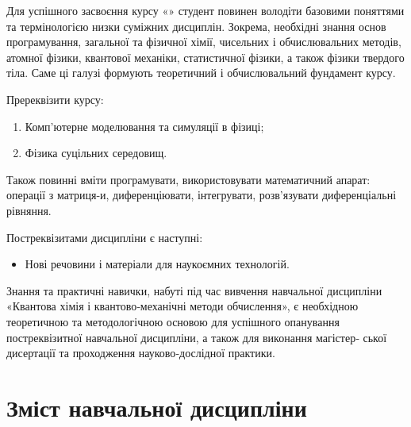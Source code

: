 \documentclass{Syllabus}
\begin{document}

Для успішного засвоєння курсу «\discipline» студент повинен володіти базовими поняттями та термінологією низки суміжних дисциплін. Зокрема, необхідні знання основ програмування, загальної та фізичної хімії, чисельних і обчислювальних методів, атомної фізики, квантової механіки, статистичної фізики, а також фізики твердого тіла. Саме ці галузі формують теоретичний і обчислювальний фундамент курсу.

Пререквізити курсу:

\begin{enumerate}
\item Комп’ютерне моделювання та симуляції в фізиці;
\item Фізика суцільних середовищ.
\end{enumerate}

Також повинні вміти програмувати, використовувати математичний апарат: операції з матриця‐и, диференціювати, інтегрувати, розв’язувати диференціальні рівняння.

Постреквізитами дисципліни є наступні:
\begin{itemize}
\item Нові речовини і матеріали для наукоємних технологій.
\end{itemize}

Знання та практичні навички, набуті під час вивчення навчальної дисципліни «Квантова хімія
і квантово‐механічні методи обчислення», є необхідною теоретичною та методологічною основою
для успішного опанування постреквізитної навчальної дисципліни, а також для виконання магістер‐
ської дисертації та проходження науково‐дослідної практики.

\section{Зміст навчальної дисципліни}\label{sec:zmist}

\end{document}
